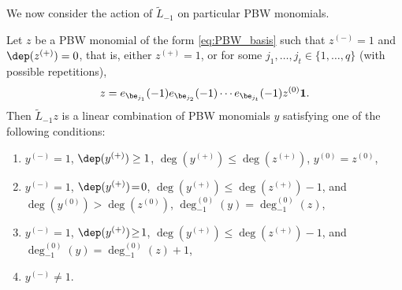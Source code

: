 We now consider the action of $\tilde{L}_{-1}$ on particular PBW monomials.
\begin{lem}
\label{lem:Sugawara_bracket}
Let $z$ be a PBW monomial of the form \eqref{eq:PBW_basis}
such that $z^{(-)}=1$ and $\dep(z^{(+)})=0$, that is,
either $z^{(+)}=1$, or for some $j_1,\dots,j_t \in \{1,\dots,q\}$
(with possible repetitions),\vspace*{-3pt}
\begin{equation*}
z = e_{\be_{j_1}}(-1)e_{\be_{j_2}}(-1)\cdots e_{\be_{j_t}}(-1) z ^{(0)} \mathbf{1}.
\end{equation*}
Then $\tilde{L}_{-1}z$
is a linear combination of PBW monomials $y$ satisfying one of the following
conditions:
\begin{enumerate}
\item\label{lem:Sugawara_bracket1}
$\!y^{(-)}=1$, $\dep(y^{(+)})\geq 1$, $\deg(y^{(+)})\leq \deg(z^{(+)})$,
$y^{(0)}=z^{(0)}$,
\item\label{lem:Sugawara_bracket2}
$\!y^{(-)}\!=\!1$, $\dep(y^{(+)})\!=\!0$, $\deg (y^{(+)})\!\leq\! \deg (z^{(+)})-1$, and
$\deg(y^{(0)})\!>\!\deg(z^{(0)})$, $\deg_{-1}^{(0)}(y)=\deg_{-1}^{(0)}(z)$,
\item\label{lem:Sugawara_bracket3}
$\!y^{(-)}\!=\!1$, $\dep(y^{(+)})\!\geq\!1$, $\deg(y^{(+)})\!\leq\!\deg(z^{(+)})-1$, and \hbox{$\deg_{-1}^{(0)}(y)\!=\!\deg_{-1}^{(0)}(z)\!+\!1$},
\item\label{lem:Sugawara_bracket4}
$\!y^{(-)}\neq 1$.
\end{enumerate}
\end{lem}
